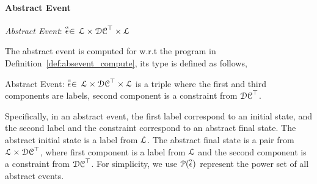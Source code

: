  \paragraph{Abstract Event} 
 \emph{Abstract Event}: 
   $\stackrel{\scriptscriptstyle{\alpha}}{\mathtt{\epsilon}{}} \in $
   $\mathcal{L} \times \mathcal{DC}^{\top} \times \mathcal{L}$

 The abstract event is computed for w.r.t the program in Definition~\ref{def:absevent_compute}, 
its type is defined as follows,
 \begin{defn}
   \label{def:abs_event}
   Abstract Event: 
   $\stackrel{\scriptscriptstyle{\alpha}}{\mathtt{\epsilon}{}} \in $
   $\mathcal{L} \times \mathcal{DC}^{\top} \times \mathcal{L}$
   is a 
   triple where the first and third components are labels,
   second component is a constraint from $\mathcal{DC}^{\top}$.
   \end{defn}
   Specifically, in an abstract event, 
   the first label correspond to an initial state, and 
   the second label and the constraint correspond to an abstract final state.
  The abstract initial state is a label from $\mathcal{L}$.
 The abstract final state is a pair from $\mathcal{L} \times \mathcal{DC}^{\top}$,  
 where first component is a label from $\mathcal{L}$ and the second component is a constraint from $\mathcal{DC}^{\top}$.
 For simplicity, we use $\mathcal{P}(\stackrel{\scriptscriptstyle{\alpha}}{\mathtt{\epsilon}{}})$ represent the power set of all abstract events.

